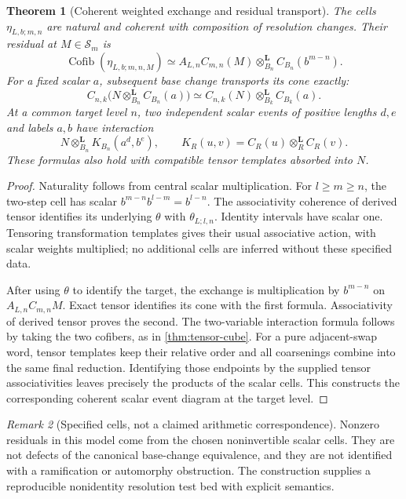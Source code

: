 \documentclass[11pt]{article}
\newtheorem{theorem}{Theorem}[section]
\theoremstyle{definition}
\theoremstyle{remark}
\newtheorem{remark}[theorem]{Remark}
\newcommand{\Cofib}{\operatorname{Cofib}}
\begin{document}
\begin{theorem}[Coherent weighted exchange and residual transport]\label{thm:weighted-adic-exchange}
The cells $\eta_{L,b;m,n}$ are natural and coherent with composition of resolution changes. Their residual at $M\in\mathcal S_m$ is
\[
 \Cofib(\eta_{L,b;m,n,M})\simeq
 A_{L,n}C_{m,n}(M)\otimes^{\mathbf L}_{B_n}C_{B_n}(b^{m-n}).
\]
For a fixed scalar $a$, subsequent base change transports its cone exactly:
\[
 C_{n,k}\bigl(N\otimes^{\mathbf L}_{B_n}C_{B_n}(a)\bigr)
 \simeq C_{n,k}(N)\otimes^{\mathbf L}_{B_k}C_{B_k}(a).
\]
At a common target level $n$, two independent scalar events of positive lengths $d,e$ and labels $a,b$ have interaction
\[
 N\otimes^{\mathbf L}_{B_n}K_{B_n}(a^d,b^e),\qquad
 K_R(u,v)=C_R(u)\otimes^{\mathbf L}_R C_R(v).
\]
These formulas also hold with compatible tensor templates absorbed into $N$.
\end{theorem}
\begin{proof}
Naturality follows from central scalar multiplication. For $l\geq m\geq n$, the two-step cell has scalar $b^{m-n}b^{l-m}=b^{l-n}$. The associativity coherence of derived tensor identifies its underlying $\theta$ with $\theta_{L;l,n}$. Identity intervals have scalar one. Tensoring transformation templates gives their usual associative action, with scalar weights multiplied; no additional cells are inferred without these specified data.

After using $\theta$ to identify the target, the exchange is multiplication by $b^{m-n}$ on $A_{L,n}C_{m,n}M$. Exact tensor identifies its cone with the first formula. Associativity of derived tensor proves the second. The two-variable interaction formula follows by taking the two cofibers, as in \cref{thm:tensor-cube}. For a pure adjacent-swap word, tensor templates keep their relative order and all coarsenings combine into the same final reduction. Identifying those endpoints by the supplied tensor associativities leaves precisely the products of the scalar cells. This constructs the corresponding coherent scalar event diagram at the target level.
\end{proof}

\begin{remark}[Specified cells, not a claimed arithmetic correspondence]
Nonzero residuals in this model come from the chosen noninvertible scalar cells. They are not defects of the canonical base-change equivalence, and they are not identified with a ramification or automorphy obstruction. The construction supplies a reproducible nonidentity resolution test bed with explicit semantics.
\end{remark}
\end{document}
